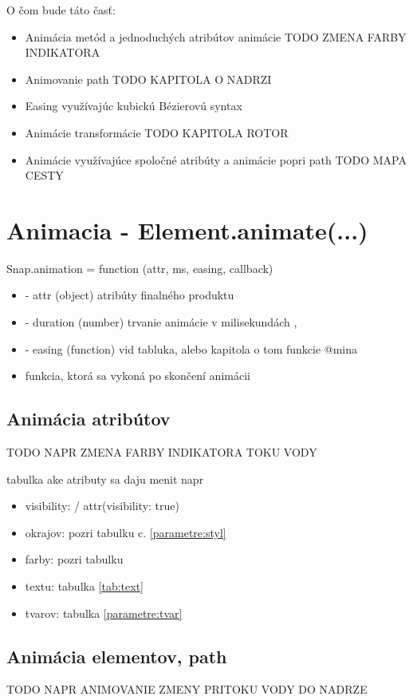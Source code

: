 O čom bude táto časť: 
\begin{itemize}
	\item Animácia metód a jednoduchých atribútov animácie TODO ZMENA FARBY INDIKATORA 
	\item Animovanie path TODO KAPITOLA O NADRZI
	\item Easing využívajúc kubickú Bézierovú syntax
	\item Animácie transformácie TODO KAPITOLA ROTOR
	\item Animácie využívajúce spoločné atribúty a animácie popri path TODO MAPA CESTY
\end{itemize}

\section{Animacia - Element.animate(...)}
Snap.animation = function (attr, ms, easing, callback) 
\begin{itemize}
\item	- attr (object) atribúty finalného produktu
\item	- duration (number) trvanie animácie v milisekundách , 
\item - easing (function) vid tabluka, alebo kapitola o tom 	funkcie  @mina 
\item funkcia, ktorá sa vykoná po skončení animácii
\end{itemize}



\subsection{Animácia atribútov}
TODO NAPR ZMENA FARBY INDIKATORA TOKU VODY

tabulka ake atributy sa daju menit
napr
\begin{itemize}
	\item visibility: / attr({visibility: true})
	\item okrajov: pozri tabulku c. \ref{parametre:styl}
	\item farby: pozri tabulku 
	\item textu: tabulka \ref{tab:text}
	\item tvarov: tabulka \ref{parametre:tvar}
\end{itemize}



\subsection{Animácia elementov, path}
TODO NAPR ANIMOVANIE ZMENY PRITOKU VODY DO NADRZE

